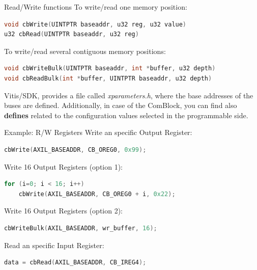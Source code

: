 \documentclass[aspectratio=169]{beamer}
\begin{document}
\begin{frame}[fragile]{Read/Write functions}
  To write/read one memory position:
  \begin{lstlisting}[language=C, numbers=none, basicstyle=\scriptsize]
void cbWrite(UINTPTR baseaddr, u32 reg, u32 value)
u32 cbRead(UINTPTR baseaddr, u32 reg)
  \end{lstlisting}
To write/read several contiguous memory positions:
  \begin{lstlisting}[language=C, numbers=none, basicstyle=\scriptsize]
void cbWriteBulk(UINTPTR baseaddr, int *buffer, u32 depth)
void cbReadBulk(int *buffer, UINTPTR baseaddr, u32 depth)
  \end{lstlisting}
Vitis/SDK, provides a file called \textit{xparameters.h}, where the base addresses of the buses are defined. Additionally, in case of the ComBlock, you can find also \textbf{defines} related to the configuration values selected in the programmable side.
\end{frame}


\begin{frame}[fragile]{Example: R/W Registers}
Write an specific Output Register:
  \begin{lstlisting}[language=C, numbers=none, basicstyle=\scriptsize]
cbWrite(AXIL_BASEADDR, CB_OREG0, 0x99);
  \end{lstlisting}
Write 16 Output Registers (option 1):
  \begin{lstlisting}[language=C, numbers=none, basicstyle=\scriptsize]
for (i=0; i < 16; i++)
    cbWrite(AXIL_BASEADDR, CB_OREG0 + i, 0x22);
  \end{lstlisting}
Write 16 Output Registers (option 2):
  \begin{lstlisting}[language=C, numbers=none, basicstyle=\scriptsize]
cbWriteBulk(AXIL_BASEADDR, wr_buffer, 16);
  \end{lstlisting}
Read an specific Input Register:
  \begin{lstlisting}[language=C, numbers=none, basicstyle=\scriptsize]
data = cbRead(AXIL_BASEADDR, CB_IREG4);
  \end{lstlisting}
\end{frame}
\end{document}
